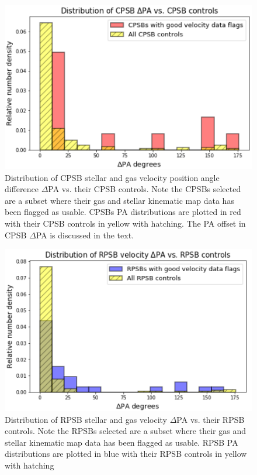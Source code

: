 \begin{figure}
    \centering
    \includegraphics[width=\columnwidth]{images/JupyterPlots/DIST-DPA-CPSB+FLAGS+controls.png}
    \caption[Distribution of CPSB $\Delta$PA vs. their CPSB controls]{Distribution of CPSB stellar and gas velocity position angle difference $\Delta$PA vs. their CPSB controls. Note the CPSBs selected are a subset where their gas and stellar kinematic map data has been flagged as usable. CPSBs PA distributions are plotted in red with their CPSB controls in yellow with hatching. The PA offset in CPSB $\Delta$PA is discussed in the text.}
    \label{fig:CPSBvsControlDeltaPAs}
\end{figure}

\begin{figure}
    \centering
    \includegraphics[width=\columnwidth]{images/JupyterPlots/DIST-Good-RPSB+Flags+Controls.png}
    \caption[Distribution of RPSB velocity $\Delta$PA vs. their RPSB controls]{Distribution of RPSB stellar and gas velocity $\Delta$PA vs. their RPSB controls. Note the RPSBs selected are a subset where their gas and stellar kinematic map data has been flagged as usable. RPSB PA distributions are plotted in blue with their RPSB controls in yellow with hatching}
    \label{fig:RPSBvsControlDeltaPAs}
\end{figure}

